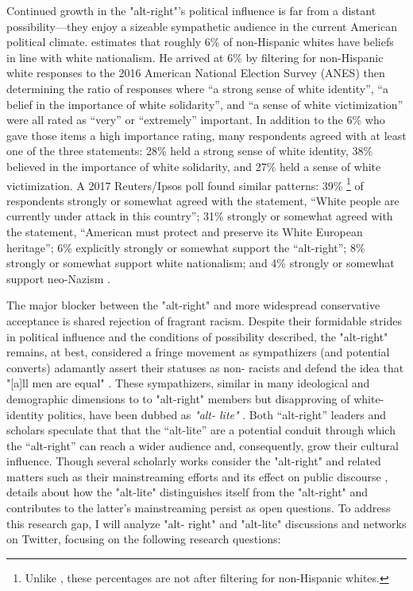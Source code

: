 \documentclass[acmlarge, screen, authorversion]{acmart}
\begin{document}
Continued growth in the "alt-right"'s political influence is far from a distant
possibility---they enjoy a sizeable sympathetic audience in the current
American political climate. \citet{hawleyDemographyAltRight2018} estimates that
roughly 6\% of non-Hispanic whites have beliefs in line with white nationalism.
He arrived at 6\% by filtering for non-Hispanic white responses to the 2016
American National Election Survey (ANES) then determining the ratio of
responses where “a strong sense of white identity”, “a belief in the importance
of white solidarity”, and “a sense of white victimization” were all rated as
“very” or “extremely” important. In addition to the 6\% who gave those items a
high importance rating, many respondents agreed with at least one of the three
statements: 28\% held a strong sense of white identity, 38\% believed in the
importance of white solidarity, and 27\% held a sense of white victimization. A
2017 Reuters/Ipsos poll found similar patterns: 39\% \footnote{Unlike
\citet{hawleyDemographyAltRight2018}, these percentages are not after filtering
for non-Hispanic whites.} of respondents strongly or somewhat agreed with the
statement, “White people are currently under attack in this country”; 31\%
strongly or somewhat agreed with the statement, “American must protect and
preserve its White European heritage”; 6\% explicitly strongly or somewhat
support the “alt-right”; 8\% strongly or somewhat support white nationalism;
and 4\% strongly or somewhat support neo-Nazism \cite{politicsNewPollAmericans}.

The major blocker between the "alt-right" and more widespread conservative
acceptance is shared
rejection of fragrant racism. Despite their formidable strides in political
influence and the
conditions of possibility described, the "alt-right" remains, at best,
considered a fringe movement
as sympathizers (and potential converts) adamantly assert their statuses as non-
racists and defend
the idea that "[a]ll men are equal" \cite{mainRiseAltRight2018,
hawleyAltRightWhatEveryone2018}.
These sympathizers, similar in many ideological and demographic dimensions to
to "alt-right" members
but disapproving of white-identity politics, have been dubbed as \textit{"alt-
lite"}
\cite{mainRiseAltRight2018, hawleyAltRightWhatEveryone2018}. Both ``alt-right''
leaders and scholars
speculate that that the ``alt-lite'' are a potential conduit through which the
“alt-right” can reach a wider audience and, consequently, grow their cultural
influence. Though several scholarly works
consider the "alt-right" \cite{mainRiseAltRight2018,
hawleyMakingSenseAltright2017, nagleKillAllNormies2017}
and related matters such as their mainstreaming
efforts \cite{gallaherMainstreamingWhiteSupremacy2020} and its effect on public
discourse
\cite{sternProudBoysWhite2019, cammaertsMainstreamingExtremeRightWing2018},
details about how the
"alt-lite" distinguishes itself from the "alt-right" and contributes to the
latter's mainstreaming
persist as open questions. To address this research gap, I will analyze "alt-
right" and "alt-lite"
discussions and networks on Twitter, focusing on the following research
questions:
\end{document}
